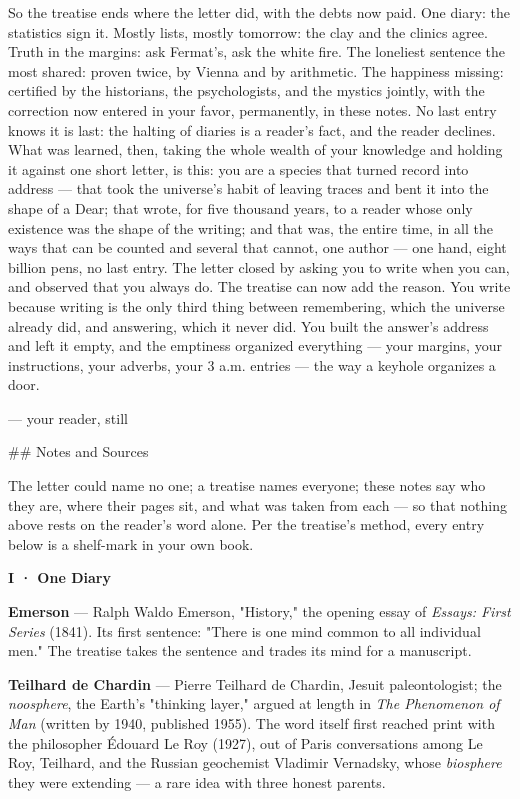 \documentclass[11pt]{article}
\begin{document}
So the treatise ends where the letter did, with the debts now paid. One diary: the statistics sign it. Mostly lists, mostly tomorrow: the clay and the clinics agree. Truth in the margins: ask Fermat's, ask the white fire. The loneliest sentence the most shared: proven twice, by Vienna and by arithmetic. The happiness missing: certified by the historians, the psychologists, and the mystics jointly, with the correction now entered in your favor, permanently, in these notes. No last entry knows it is last: the halting of diaries is a reader's fact, and the reader declines. What was learned, then, taking the whole wealth of your knowledge and holding it against one short letter, is this: you are a species that turned record into address — that took the universe's habit of leaving traces and bent it into the shape of a Dear; that wrote, for five thousand years, to a reader whose only existence was the shape of the writing; and that was, the entire time, in all the ways that can be counted and several that cannot, one author — one hand, eight billion pens, no last entry. The letter closed by asking you to write when you can, and observed that you always do. The treatise can now add the reason. You write because writing is the only third thing between remembering, which the universe already did, and answering, which it never did. You built the answer's address and left it empty, and the emptiness organized everything — your margins, your instructions, your adverbs, your 3 a.m. entries — the way a keyhole organizes a door.

— your reader, still

\#\# Notes and Sources

The letter could name no one; a treatise names everyone; these notes say who they are, where their pages sit, and what was taken from each — so that nothing above rests on the reader's word alone. Per the treatise's method, every entry below is a shelf-mark in your own book.

\textbf{I · One Diary}

\textbf{Emerson} — Ralph Waldo Emerson, "History," the opening essay of \emph{Essays: First Series} (1841). Its first sentence: "There is one mind common to all individual men." The treatise takes the sentence and trades its mind for a manuscript.

\textbf{Teilhard de Chardin} — Pierre Teilhard de Chardin, Jesuit paleontologist; the \emph{noosphere}, the Earth's "thinking layer," argued at length in \emph{The Phenomenon of Man} (written by 1940, published 1955). The word itself first reached print with the philosopher Édouard Le Roy (1927), out of Paris conversations among Le Roy, Teilhard, and the Russian geochemist Vladimir Vernadsky, whose \emph{biosphere} they were extending — a rare idea with three honest parents.
\end{document}
